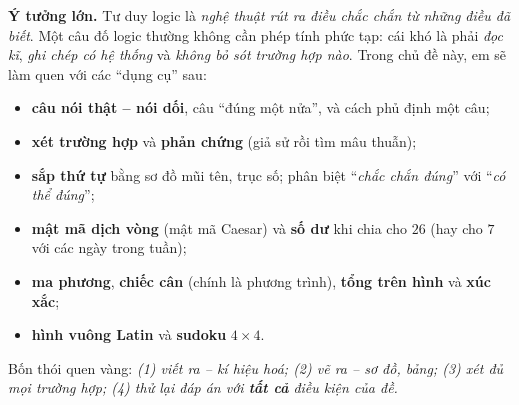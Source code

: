 \documentclass[11pt]{article}
\begin{document}
\begin{knowbox}
\textbf{Ý tưởng lớn.} Tư duy logic là \emph{nghệ thuật rút ra điều chắc chắn từ những điều đã biết}. Một câu đố logic
thường không cần phép tính phức tạp: cái khó là phải \emph{đọc kĩ}, \emph{ghi chép có hệ thống} và \emph{không bỏ sót trường hợp nào}.
Trong chủ đề này, em sẽ làm quen với các ``dụng cụ'' sau:
\begin{itemize}[leftmargin=1.4em,itemsep=1pt,topsep=2pt]
  \item \textbf{câu nói thật -- nói dối}, câu ``đúng một nửa'', và cách phủ định một câu;
  \item \textbf{xét trường hợp} và \textbf{phản chứng} (giả sử rồi tìm mâu thuẫn);
  \item \textbf{sắp thứ tự} bằng sơ đồ mũi tên, trục số; phân biệt ``\emph{chắc chắn đúng}'' với ``\emph{có thể đúng}'';
  \item \textbf{mật mã dịch vòng} (mật mã Caesar) và \textbf{số dư} khi chia cho $26$ (hay cho $7$ với các ngày trong tuần);
  \item \textbf{ma phương}, \textbf{chiếc cân} (chính là phương trình), \textbf{tổng trên hình} và \textbf{xúc xắc};
  \item \textbf{hình vuông Latin} và \textbf{sudoku} $4\times 4$.
\end{itemize}
Bốn thói quen vàng: \emph{(1) viết ra -- kí hiệu hoá; (2) vẽ ra -- sơ đồ, bảng; (3) xét đủ mọi trường hợp; (4) thử lại
đáp án với \textbf{tất cả} điều kiện của đề.}
\end{knowbox}
\vspace{0.3cm}
\end{document}
